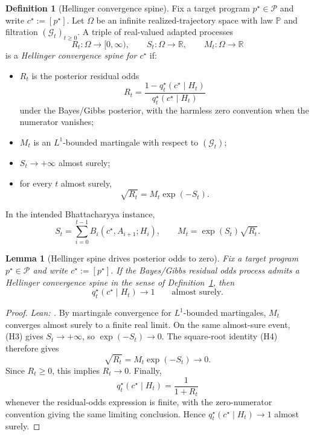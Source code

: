 \documentclass[11pt]{article}
\newtheorem{lemma}[theorem]{Lemma}
\theoremstyle{definition}
\newtheorem{definition}[theorem]{Definition}
\theoremstyle{remark}
\theoremstyle{plain}
\theoremstyle{definition}
\newcommand{\Pcal}{\mathcal{P}}
\newcommand{\Prob}{\mathbb{P}}
\begin{document}
\begin{definition}[Hellinger convergence spine]
\label{def:hellinger-spine}
Fix a target program $p^\star\in\Pcal$ and write $c^\star:=[p^\star]$. Let $\Omega$ be an infinite realized-trajectory space with law $\Prob$ and filtration $(\mathcal G_t)_{t\ge0}$. A triple of real-valued adapted processes
\[
R_t:\Omega\to[0,\infty),
\qquad
S_t:\Omega\to\mathbb R,
\qquad
M_t:\Omega\to\mathbb R
\]
is a \emph{Hellinger convergence spine for $c^\star$} if:
\begin{itemize}
\item[(H1)] $R_t$ is the posterior residual odds
\[
R_t=\frac{1-q_t^\star(c^\star\mid H_t)}{q_t^\star(c^\star\mid H_t)}
\]
under the Bayes/Gibbs posterior, with the harmless zero convention when the numerator vanishes;
\item[(H2)] $M_t$ is an $L^1$-bounded martingale with respect to $(\mathcal G_t)$;
\item[(H3)] $S_t\to+\infty$ almost surely;
\item[(H4)] for every $t$ almost surely,
\[
\sqrt{R_t}=M_t\exp(-S_t).
\]
\end{itemize}
In the intended Bhattacharyya instance,
\[
S_t=\sum_{i=0}^{t-1}B_i(c^\star,A_{i+1};H_i),
\qquad
M_t=\exp(S_t)\sqrt{R_t}.
\]
\end{definition}

\begin{lemma}[Hellinger spine drives posterior odds to zero]
\label{lem:contraction}
Fix a target program $p^\star\in\Pcal$ and write $c^\star:=[p^\star]$. If the Bayes/Gibbs residual odds process admits a Hellinger convergence spine in the sense of Definition~\ref{def:hellinger-spine}, then
\[
q_t^\star(c^\star\mid H_t)\to 1
\qquad
\text{almost surely.}
\]
\end{lemma}

\begin{proof}
\noindent\emph{Lean: .}
By martingale convergence for $L^1$-bounded martingales, $M_t$ converges almost surely to a finite real limit. On the same almost-sure event, (H3) gives $S_t\to+\infty$, so $\exp(-S_t)\to0$. The square-root identity (H4) therefore gives
\[
\sqrt{R_t}=M_t\exp(-S_t)\longrightarrow 0.
\]
Since $R_t\ge0$, this implies $R_t\to0$. Finally,
\[
q_t^\star(c^\star\mid H_t)=\frac{1}{1+R_t}
\]
whenever the residual-odds expression is finite, with the zero-numerator convention giving the same limiting conclusion. Hence $q_t^\star(c^\star\mid H_t)\to1$ almost surely.
\end{proof}
\end{document}

